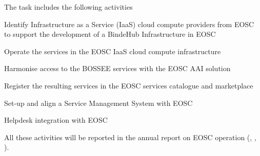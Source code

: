 \begin{task}[
  title=Collaboration with EOSC,
  id=eosc,
  lead=EGI,
  PM=24,
  wphases={12-48},
  partners={SRL,XFEL,WTT}
]
  The task includes the following activities

  \begin{compactitem}
  \item Identify Infrastructure as a Service (IaaS) cloud compute providers from EOSC to support the development of a BindeHub Infrastructure in EOSC
  \item Operate the services in the EOSC IaaS cloud compute infrastructure
  \item Harmonise access to the BOSSEE services with the EOSC AAI solution
  \item Register the resulting services in the EOSC services catalogue and marketplace
  \item Set-up and align a Service Management System with EOSC
  \item Helpdesk integration with EOSC
  \end{compactitem}

   All these activities will be reported in the annual report on EOSC operation (, , ).
\end{task}

